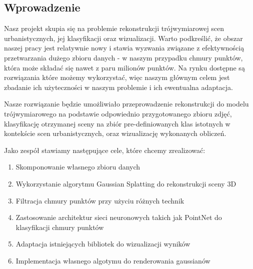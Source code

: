 \subsection{Wprowadzenie}
Nasz projekt skupia się na problemie rekonstrukcji trójwymiarowej scen urbanistycznych, jej klasyfikacji oraz wizualizacji. Warto podkreślić, że obszar naszej pracy jest relatywnie nowy i stawia wyzwania związane z efektywnością przetwarzania dużego zbioru danych - w naszym przypadku chmury punktów, która może składać się nawet z paru milionów punktów. Na rynku dostępne są rozwiązania które możemy wykorzystać, więc naszym głównym celem jest zbadanie ich użyteczności w naszym problemie i ich ewentualna adaptacja. 

Nasze rozwiązanie będzie umożliwiało przeprowadzenie rekonstrukcji do modelu trójwymiarowego na podstawie odpowiednio przygotowanego zbioru zdjęć, klasyfikację otrzymanej sceny na zbiór pre-definiowanych klas istotnych w kontekście scen urbanistycznych, oraz wizualizację wykonanych obliczeń. 

Jako zespół stawiamy następujące cele, które chcemy zrealizować:

\begin{enumerate}
    \item Skomponowanie własnego zbioru danych 
    \item Wykorzystanie algorytmu Gaussian Splatting do rekonstrukcji sceny 3D
    \item Filtracja chmury punktów przy użyciu różnych technik 
    \item Zastosowanie architektur sieci neuronowych takich jak PointNet do klasyfikacji chmury punktów 
    \item Adaptacja istniejących bibliotek do wizualizacji wyników 
    \item Implementacja własnego algotymu do renderowania gaussianów
\end{enumerate}